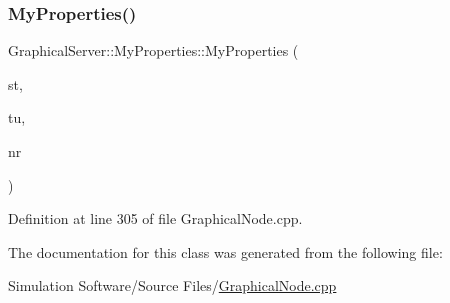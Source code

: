 \subsubsection{\texorpdfstring{My\+Properties()}{MyProperties()}\hspace{0.1cm}{\footnotesize\ttfamily [2/2]}}
{\footnotesize\ttfamily Graphical\+Server\+::\+My\+Properties\+::\+My\+Properties (\begin{DoxyParamCaption}\item[{double}]{st,  }\item[{\hyperlink{_simulation_executive_8h_add9fe45e09605eee3e4a39c8a5c4476d}{Time\+Unit}}]{tu,  }\item[{int}]{nr }\end{DoxyParamCaption})\hspace{0.3cm}{\ttfamily [inline]}}



Definition at line 305 of file Graphical\+Node.\+cpp.



The documentation for this class was generated from the following file\+:\begin{DoxyCompactItemize}
\item 
Simulation Software/\+Source Files/\hyperlink{_graphical_node_8cpp}{Graphical\+Node.\+cpp}\end{DoxyCompactItemize}
